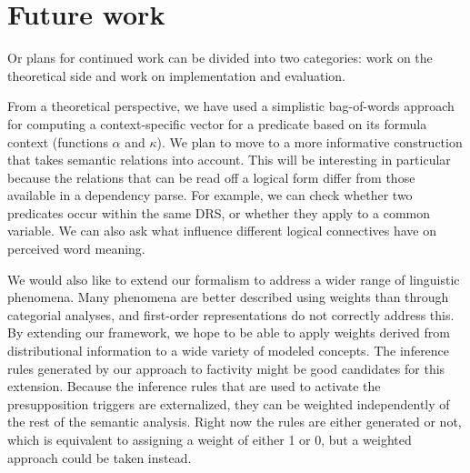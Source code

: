 \section{Future work}
\label{sec:future}

Or plans for continued work can be divided into two categories: work on the
theoretical side and work on implementation and evaluation.

From a theoretical perspective, we have used a simplistic bag-of-words
approach for
computing a context-specific vector for a predicate based on its
formula context (functions $\alpha$ and $\kappa$). We plan to move to a more informative construction
that takes semantic relations into account. This will be interesting in particular because the relations that can be read off a logical
form differ from those available in a dependency parse. For example,
we can check whether two predicates occur within the same DRS, or
whether they apply to a common variable. We can also ask what 
influence different logical connectives have on perceived word meaning. 

We would also like to extend our formalism to address a wider range of
linguistic phenomena.  Many phenomena are better described using weights than
through categorial analyses, and first-order representations do not correctly
address this.  By extending our framework, we hope to be able to apply weights
derived from distributional information to a wide variety of modeled concepts.
The inference rules generated by our approach to factivity might be good
candidates for this extension.  Because the inference rules that are used to
activate the presupposition triggers are externalized, they can be weighted
independently of the rest of the semantic analysis.  Right now the rules are
either generated or not, which is equivalent to assigning a weight of either 1
or 0, but a weighted approach could be taken instead.
%


